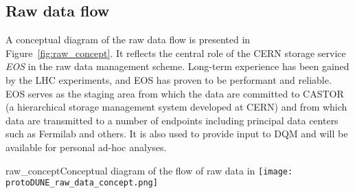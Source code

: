\subsection{Raw data flow}
\label{sec:raw_concept}


A conceptual diagram of the raw data flow is presented in
Figure~\ref{fig:raw_concept}.  It reflects the central role of the
CERN storage service \textit{EOS} in the raw data management scheme.
Long-term experience has been gained by the LHC experiments, and EOS
has proven to be performant and reliable.  EOS serves as the staging
area from which the data are committed to CASTOR (a hierarchical
storage management system developed at CERN) and from which data are
transmitted to a number of endpoints including principal data centers
such as Fermilab and others.  It is also used to provide input to DQM
and will be available for personal ad-hoc analyses.

\begin{cdrfigure}{raw_concept}{Conceptual diagram of the flow of raw data in \pdsp} 
\texttt{[image: protoDUNE\_raw\_data\_concept.png]}
\end{cdrfigure}


